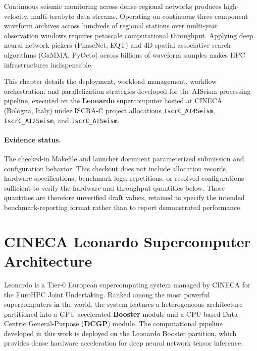 
\label{chap:hpc}

Continuous seismic monitoring across dense regional networks
produces high-velocity, multi-terabyte data streams. Operating on
continuous three-component waveform archives across hundreds of
regional stations over multi-year observation windows requires
petascale computational throughput. Applying deep neural network
pickers (\ac{PhaseNet}, \ac{EQT}) and 4D spatial
associative search algorithms (\ac{GaMMA}, \ac{PyOcto}) across
billions of waveform samples makes \ac{HPC} infrastructures indispensable.

This chapter details the deployment, workload management, workflow
orchestration, and parallelization strategies developed for the
AISeism processing pipeline, executed on the \textbf{Leonardo}
supercomputer hosted at \ac{CINECA} (Bologna, Italy) under ISCRA-C
project allocations \texttt{IscrC\_AI4Seism}, \texttt{IscrC\_AI2Seism}, and
\texttt{IscrC\_AISeism}.

\paragraph{Evidence status.} The checked-in Makefile and launcher
document parameterized submission and configuration behavior. This
checkout does not include allocation records, hardware
specifications, benchmark logs, repetitions, or resolved
configurations sufficient to verify the hardware and throughput
quantities below. Those quantities are therefore unverified draft
values, retained to specify the intended benchmark-reporting format
rather than to report demonstrated performance.

\section{CINECA Leonardo Supercomputer Architecture}
\label{sec:leonardo_architecture}

Leonardo is a Tier-0 European supercomputing system managed by
\ac{CINECA} for the EuroHPC Joint Undertaking. Ranked among the most
powerful supercomputers in the world, the system features a
heterogeneous architecture partitioned into a \ac{GPU}-accelerated
\textbf{Booster} module and a \ac{CPU}-based Data-Centric General-Purpose
(\textbf{\ac{DCGP}}) module. The computational pipeline developed in this
work is deployed on the Leonardo Booster partition, which provides
dense hardware acceleration for deep neural network tensor inference.

